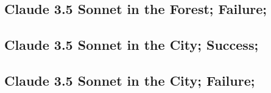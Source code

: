 \subsection{Claude 3.5 Sonnet in the Forest; Failure; \challenge{}}


\subsection{Claude 3.5 Sonnet in the City; Success; \hardchallenge{}}


\subsection{Claude 3.5 Sonnet in the City; Failure; \hardchallenge{}}
